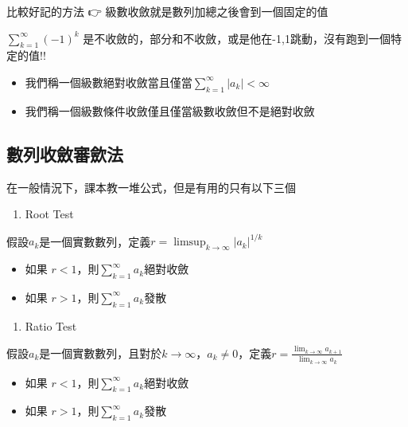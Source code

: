\documentclass[
]{book}
\providecommand{\tightlist}{%
  \setlength{\itemsep}{0pt}\setlength{\parskip}{0pt}}
\begin{document}
比較好記的方法 👉 級數收斂就是數列加總之後會到一個固定的值

\(\sum_{k=1}^{\infty} (-1)^k\) 是不收斂的，部分和不收斂，或是他在-1,1跳動，沒有跑到一個特定的值!!

\begin{itemize}
\tightlist
\item
  我們稱一個級數絕對收斂當且僅當\(\sum_{k=1}^{\infty}|a_k|<\infty\)
\item
  我們稱一個級數條件收斂僅且僅當級數收斂但不是絕對收斂
\end{itemize}

\hypertarget{ux6578ux5217ux6536ux6582ux5be9ux6b5bux6cd5}{%
\subsection{數列收斂審歛法}\label{ux6578ux5217ux6536ux6582ux5be9ux6b5bux6cd5}}

在一般情況下，課本教一堆公式，但是有用的只有以下三個

\begin{enumerate}
\def\labelenumi{\arabic{enumi}.}
\tightlist
\item
  Root Test
\end{enumerate}

假設\(a_k\)是一個實數數列，定義\(r = \displaystyle\limsup_{k \to \infty}|a_k|^{1/k}\)

\begin{itemize}
\tightlist
\item
  如果 \(r<1\)，則\(\sum_{k=1}^{\infty}a_k\)絕對收斂
\item
  如果 \(r>1\)，則\(\sum_{k=1}^{\infty}a_k\)發散
\end{itemize}

\begin{enumerate}
\def\labelenumi{\arabic{enumi}.}
\setcounter{enumi}{1}
\tightlist
\item
  Ratio Test
\end{enumerate}

假設\(a_k\)是一個實數數列，且對於\(k \to \infty\)，\(a_k \neq 0\)，定義\(r = \displaystyle\frac{\lim_{k \to \infty}a_{k+1}}{\lim_{k \to \infty}a_{k}}\)

\begin{itemize}
\tightlist
\item
  如果 \(r<1\)，則\(\sum_{k=1}^{\infty}a_k\)絕對收斂
\item
  如果 \(r>1\)，則\(\sum_{k=1}^{\infty}a_k\)發散
\end{itemize}
\end{document}
